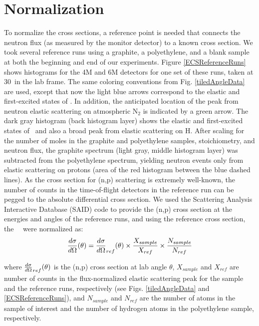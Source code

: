 \section{Normalization}
To normalize the cross sections, a reference point is needed that connects the
neutron flux (as measured by the monitor detector) to a known cross section.
We took several reference runs using a graphite,
a polyethylene, and a blank sample at both the beginning and end of our experiments.
Figure \ref{ECSReferenceRuns} shows histograms for the 4M and 6M detectors for
one set of these runs, taken at 30\textdegree\ in the lab frame.
The same coloring conventions from Fig.
\ref{tiledAngleData} are used, except that now the light blue arrows correspond to
the elastic and first-excited states of \cTwelve. In addition, the anticipated
location of the peak from neutron elastic scattering on atmospheric N$_{2}$ is
indicated by a green arrow. The dark gray histogram (back
histogram layer) shows the elastic and first-excited states
of \cTwelve\ and also a broad peak from elastic scattering on H.
After scaling for the number
of moles in the graphite and polyethylene samples, stoichiometry, and neutron
flux, the graphite spectrum (light gray, middle histogram layer) was subtracted from the polyethylene
spectrum, yielding neutron events only from elastic scattering on protons (area of
the red histogram between the blue dashed lines). As the cross section for
(n,p) scattering is extremely well-known, the number of counts in the
time-of-flight detectors in the reference run can be pegged to the absolute
differential cross section.
We used the Scattering Analysis Interactive Database (SAID) code \cite{SAIDCode}
to provide the (n,p) cross section at the energies and angles of the reference
runs, and using the reference cross section, the \snTwelveFour\
\el\ were normalized as:
\begin{equation} \label{ECSCalculation}
    \el(\theta) = \el_{ref}(\theta)
    \times \frac{X_{sample}}{X_{ref}} \times
    \frac{N_{sample}}{N_{ref}}
\end{equation}

\noindent
where $\el_{ref}(\theta)$ is the (n,p) cross section at lab angle $\theta$, $X_{sample}$
and $X_{ref}$ are number of counts in the flux-normalized elastic scattering peak for the sample
and the reference runs, respectively (see Figs. \ref{tiledAngleData} and
\ref{ECSReferenceRuns}), and $N_{sample}$ and $N_{ref}$ are the number of atoms in
the sample of interest and the number of hydrogen atoms in the polyethylene
sample, respectively.

